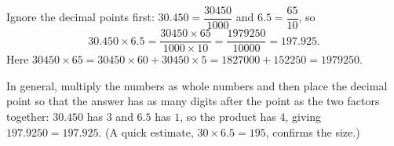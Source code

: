 Ignore the decimal points first: $30.450=\dfrac{30450}{1000}$ and $6.5=\dfrac{65}{10}$, so
\[
30.450\times6.5=\dfrac{30450\times65}{1000\times10}=\dfrac{1979250}{10000}=197.925 .
\]
Here $30450\times65=30450\times60+30450\times5=1827000+152250=1979250$.

In general, multiply the numbers as whole numbers and then place the decimal point so that the answer has as many digits after the point as the two factors together: $30.450$ has $3$ and $6.5$ has $1$, so the product has $4$, giving $197.9250=\boxed{197.925}$. (A quick estimate, $30\times6.5=195$, confirms the size.)
